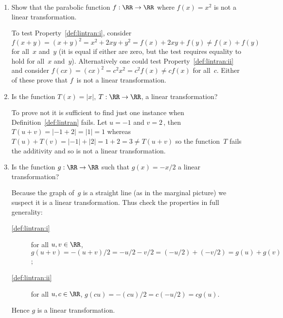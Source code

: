 \begin{example}[1D cases] \label{eg:}
\begin{enumerate}
\item Show that the parabolic function \(f:\RR\to\RR\) where \(f(x)=x^2\) is not a linear transformation.
\begin{solution} 
To test Property~\ref{def:lintran:i}, consider \(f(x+y)=(x+y)^2=x^2+2xy+y^2=f(x)+2xy+f(y)\neq f(x)+f(y)\) for all~\(x\) and~\(y\) (it is equal if either are zero, but the test requires equality to hold for all~\(x\) and~\(y\)).  
Alternatively one could test Property~\ref{def:lintran:ii} and consider \(f(cx)=(cx)^2=c^2x^2=c^2f(x)\neq cf(x)\) for all~\(c\).
Either of these prove that \(f\)~is not a linear transformation.
\end{solution}

\item Is the function \(T(x)=|x|\), \(T:\RR\to\RR\), a linear transformation? 
\begin{solution} 
To prove not it is sufficient to find just one instance when Definition~\ref{def:lintran} fails. 
Let \(u=-1\) and \(v=2\)\,, then \(T(u+v)=|-1+2|=|1|=1\) whereas \(T(u)+T(v)=|-1|+|2|=1+2=3\neq T(u+v)\) so the function~\(T\) fails the additivity and so is not a linear transformation.
\end{solution}

\item Is the function \(g:\RR\to\RR\) such that \(g(x)=-x/2\) a linear transformation?
\begin{solution} 
Because the graph of~\(g\) is a straight line (as in the marginal picture) we suspect it is a linear transformation.
Thus check the properties in full generality:
\begin{description}
\item[\ref{def:lintran:i}] for all \(u,v\in\RR\), \(g(u+v)=-(u+v)/2=-u/2-v/2=(-u/2)+(-v/2)=g(u)+g(v)\);
\item[\ref{def:lintran:ii}] for all \(u,c\in\RR\), \(g(cu)=-(cu)/2=c(-u/2)=cg(u)\).
\end{description}
Hence \(g\) is a linear transformation.
\end{solution}


\end{enumerate}
\end{example}
